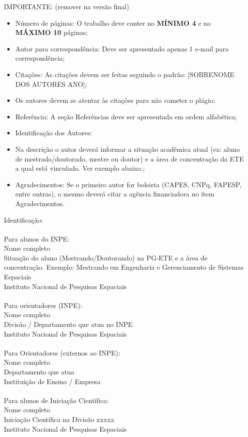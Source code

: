 \documentclass[12pt]{article}
\begin{document}
\textcolor[rgb]{1,0,0}{
IMPORTANTE: (remover na versão final)
\begin{itemize}
	\item Número de páginas: O trabalho deve conter no \textbf{MÍNIMO 4} e no \textbf{MÁXIMO 10} páginas;
	\item Autor para correspondência: Deve ser apresentado apenas 1 e-mail para correspondência;
	\item Citações: As citações devem ser feitas seguindo o padrão: [SOBRENOME DOS AUTORES ANO];
	\item Os autores devem se atentar às citações para não cometer o plágio;
	\item Referência: A seção Referências deve ser apresentada em ordem alfabética;
	\item Identificação dos Autores: 
	\item Na descrição o autor deverá informar a situação acadêmica atual (ex: aluno de mestrado/doutorado, mestre ou doutor) e a área de concentração da ETE a qual está vinculado. Ver exemplo abaixo.;
	\item Agradecimentos: Se o primeiro autor for bolsista (CAPES, CNPq, FAPESP, entre outras), o mesmo deverá citar a agência financiadora no item Agradecimentos.
\end{itemize}
Identificação:\\\\
Para alunos do INPE:\\
Nome completo\\
Situação do aluno (Mestrando/Doutorando)  na PG-ETE e a área de concentração. Exemplo: Mestrando em Engenharia e Gerenciamento de Sistemas Espaciais\\
Instituto Nacional de Pesquisas Espaciais\\\\
Para orientadores (INPE):\\
Nome completo\\
Divisão / Departamento que atua no INPE\\
Instituto Nacional de Pesquisas Espaciais\\\\
Para Orientadores (externos ao INPE):\\
Nome completo\\
Departamento que atua\\
Instituição de Ensino / Empresa\\\\
Para alunos de Iniciação Científica:\\
Nome completo\\
Iniciação Científica na Divisão xxxxx\\
Instituto Nacional de Pesquisas Espaciais\\
}
\end{document}
